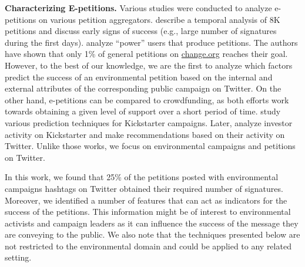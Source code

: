 \textbf{Characterizing E-petitions.} Various studies were conducted to analyze e-petitions on various petition aggregators.
\citeauthor{Hale2013}  describe a temporal analysis of 8K petitions and discuss early signs of success (e.g., large number of signatures during the first days).
\citeauthor{Huang2015}  analyze ``power'' users that produce petitions. The authors have shown that only 1\% of general petitions on \url{change.org} reaches their goal.
However, to the best of our knowledge, we are the first to analyze which factors predict the success of an environmental petition based on the internal and external attributes of the corresponding public campaign on Twitter.
On the other hand, e-petitions can be compared to crowdfunding, as both efforts work towards obtaining a given level of support over a short period of time.
\citeauthor{Etter2013}  study various prediction techniques for Kickstarter campaigns.
Later, \citeauthor{An2014}  analyze investor activity on Kickstarter and make recommendations based on their activity on Twitter. Unlike those works, we focus on environmental campaigns and petitions 
on Twitter.


In this work, we found that 25\% of the petitions posted with environmental campaigns hashtags on Twitter obtained their required number of signatures.
Moreover, we identified a number of features that can act as indicators for the success of the petitions.
This information might be of interest to environmental activists and campaign leaders as it can influence the success of the message they are conveying to the public.
We also note that the techniques presented below are not restricted to the environmental domain and could be applied to any related setting.

